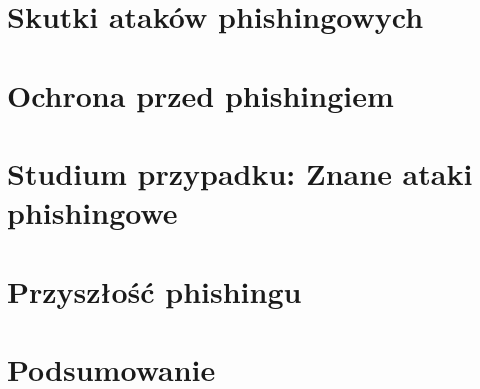 \documentclass[]{article}
\begin{document}
\section{Skutki ataków phishingowych}

\newpage
\section{Ochrona przed phishingiem}

\newpage
\section{Studium przypadku: Znane ataki phishingowe}

\newpage
\section{Przyszłość phishingu}

\newpage
\section{Podsumowanie}

\newpage


\end{document}
